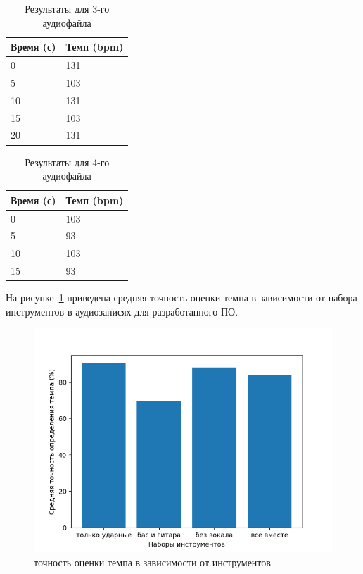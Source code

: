 \begin{table}[!h]
	\begin{center}
		\caption{\label{tab:soad_minus}Результаты для 3-го аудиофайла}
		\begin{tabular}{|p{8cm}|p{8cm}|}
			\hline
			Время (с) & Темп (bpm)\\
			\hline
			0 & 131\\
			\hline
			5 & 103\\
			\hline
			10 & 131\\
			\hline
			15 & 103\\
			\hline
			20 & 131\\
			\hline
		\end{tabular}
	\end{center}
\end{table}

\begin{table}[!h]
	\begin{center}
		\caption{\label{tab:soad_full}Результаты для 4-го аудиофайла}
		\begin{tabular}{|p{8cm}|p{8cm}|}
			\hline
			Время (с) & Темп (bpm)\\
			\hline
			0 & 103\\
			\hline
			5 & 93\\
			\hline
			10 & 103\\
			\hline
			15 & 93\\
			\hline
		\end{tabular}
	\end{center}
\end{table}

На рисунке~\ref{img:tempo_instr} приведена средняя точность оценки темпа в зависимости от набора инструментов в аудиозаписях для разработанного ПО.

\begin{figure}[h]
	\centering
	\includegraphics[scale=1]{../graphs/tempo_instr.png}
	\caption{точность оценки темпа в зависимости от инструментов}
	\label{img:tempo_instr}
\end{figure}

